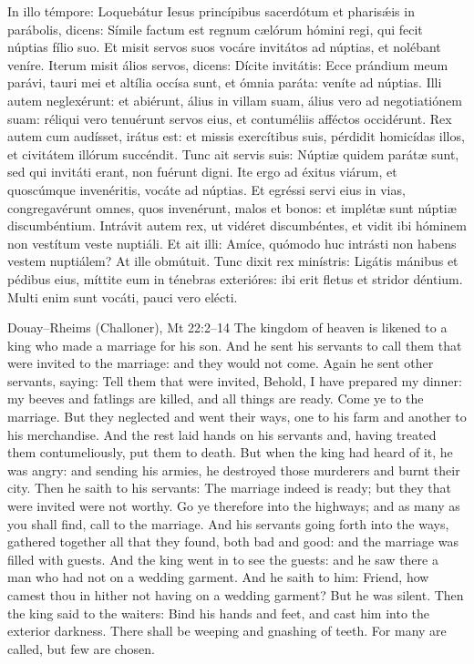 \begin{latinproper}
In illo témpore: Loquebátur Iesus princípibus sacerdótum et pharisǽis in
parábolis, dicens: Símile factum est regnum cælórum hómini regi, qui fecit
núptias fílio suo. Et misit servos suos vocáre invitátos ad núptias, et
nolébant veníre. Iterum misit álios servos, dicens: Dícite invitátis: Ecce
prándium meum parávi, tauri mei et altília occísa sunt, et ómnia paráta: veníte
ad núptias. Illi autem neglexérunt: et abiérunt, álius in villam suam, álius
vero ad negotiatiónem suam: réliqui vero tenuérunt servos eius, et contuméliis
afféctos occidérunt. Rex autem cum audísset, irátus est: et missis exercítibus
suis, pérdidit homicídas illos, et civitátem illórum succéndit. Tunc ait servis
suis: Núptiæ quidem parátæ sunt, sed qui invitáti erant, non fuérunt digni. Ite
ergo ad éxitus viárum, et quoscúmque invenéritis, vocáte ad núptias. Et egréssi
servi eius in vias, congregavérunt omnes, quos invenérunt, malos et bonos: et
implétæ sunt núptiæ discumbéntium. Intrávit autem rex, ut vidéret
discumbéntes, et vidit ibi hóminem non vestítum veste nuptiáli. Et ait illi:
Amíce, quómodo huc intrásti non habens vestem nuptiálem? At ille obmútuit. Tunc
dixit rex minístris: Ligátis mánibus et pédibus eius, míttite eum in ténebras
exterióres: ibi erit fletus et stridor déntium. Multi enim sunt vocáti, pauci
vero elécti.
\end{latinproper}

\begin{englishwitness}{Douay--Rheims (Challoner), Mt 22:2--14}
The kingdom of heaven is likened to a king who made a marriage for his son. And
he sent his servants to call them that were invited to the marriage: and they
would not come. Again he sent other servants, saying: Tell them that were
invited, Behold, I have prepared my dinner: my beeves and fatlings are killed,
and all things are ready. Come ye to the marriage. But they neglected and went
their ways, one to his farm and another to his merchandise. And the rest laid
hands on his servants and, having treated them contumeliously, put them to
death. But when the king had heard of it, he was angry: and sending his armies,
he destroyed those murderers and burnt their city. Then he saith to his
servants: The marriage indeed is ready; but they that were invited were not
worthy. Go ye therefore into the highways; and as many as you shall find, call
to the marriage. And his servants going forth into the ways, gathered together
all that they found, both bad and good: and the marriage was filled with
guests. And the king went in to see the guests: and he saw there a man who had
not on a wedding garment. And he saith to him: Friend, how camest thou in
hither not having on a wedding garment? But he was silent. Then the king said
to the waiters: Bind his hands and feet, and cast him into the exterior
darkness. There shall be weeping and gnashing of teeth. For many are called,
but few are chosen.
\end{englishwitness}

